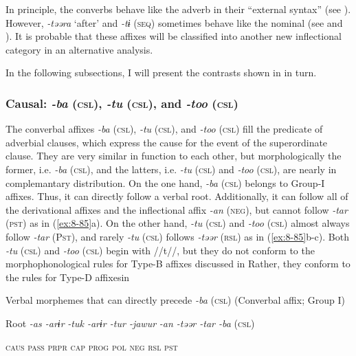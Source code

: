   In principle, the converbs behave like the adverb in their “external syntax” (see ). However, \textit{-təəra} ‘after’ and \textit{-tɨ} (\textsc{seq}) sometimes behave like the nominal (see  and ). It is probable that these affixes will be classified into another new inflectional category in an alternative analysis.

In the following subsections, I will present the contrasts shown in  in turn.

\subsubsection{Causal: \textit{-ba} (\textsc{csl}), \textit{-tu} (\textsc{csl}), and \textit{-too} (\textsc{csl})}

The converbal affixes \textit{-ba} (\textsc{csl}), \textit{-tu} (\textsc{csl}), and \textit{-too} (\textsc{csl}) fill the predicate of adverbial clauses, which express the cause for the event of the superordinate clause. They are very similar in function to each other, but morphologically the former, i.e. \textit{-ba} (\textsc{csl}), and the latters, i.e. \textit{-tu} (\textsc{csl}) and \textit{-too} (\textsc{csl}), are nearly in complemantary distribution. On the one hand, \textit{-ba} (\textsc{csl}) belongs to Group-I affixes. Thus, it can directly follow a verbal root. Additionally, it can follow all of the derivational affixes and the inflectional affix \textit{-an} (\textsc{neg}), but cannot follow \textit{-tar} (\textsc{pst}) as in (\ref{ex:8-85}a). On the other hand, \textit{-tu} (\textsc{csl}) and \textit{-too} (\textsc{csl}) almost always follow \textit{-tar} (P\textsc{st}), and rarely \textit{-tu} (\textsc{csl}) follows \textit{-təər} (\textsc{rsl}) as in (\ref{ex:8-85}b-c). Both \textit{-tu} (\textsc{csl}) and \textit{-too} (\textsc{csl}) begin with //t//, but they do not conform to the morphophonological rules for Type-B affixes discussed in  Rather, they conform to the rules for Type-D affixesin 

\ea\label{ex:8-85}
\ea Verbal morphemes that can directly precede \textit{-ba} (\textsc{csl}) (Converbal affix; Group I)

  Root  \textit{-as  -arɨr} %
\textit{-tuk  -arɨr  -tur  -jawur} %
\textit{-an  -təər  -tar  -ba} (\textsc{csl})

    \textsc{caus}  \textsc{pass}  \textsc{prpr}  \textsc{cap}  \textsc{prog}  \textsc{pol}  \textsc{neg}  \textsc{rsl}  \textsc{pst}

